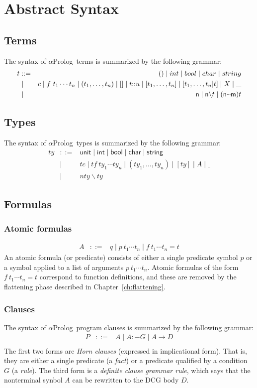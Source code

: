 \documentclass[draft,12pt]{report}
\newcommand{\aprolog}{$\alpha${Prolog}\xspace}
\newcommand{\ent}{\mathrel{{:}{-}}}
\begin{document}
\section{Abstract Syntax}
\subsection{Terms}

The syntax of \aprolog\ terms is summarized by the following grammar:
\begin{eqnarray*}
t &::=& () \mid int  \mid bool \mid char \mid string \\
&\mid&  c \mid f~t_1 \cdots t_n \mid (t_1,\ldots,t_n) \mid  [] \mid t{::}u \mid [t_1, \ldots , t_n] \mid [t_1, \ldots,t_n|t] \mid X \mid \_ \\
&\mid& \mathsf{n} \mid \mathsf{n} \backslash t \mid (\mathsf{n}\text{\symbol{126}}\mathsf{m})t
\end{eqnarray*}
\subsection{Types}
The syntax of \aprolog\ types is summarized by the following grammar:
\begin{eqnarray*}
ty &::=& \mathsf{unit} \mid \mathsf{int}  \mid \mathsf{bool} \mid \mathsf{char} \mid \mathsf{string} \\
&\mid&  tc \mid tf~ty_1 \cdots ty_n \mid (ty_1,\ldots,ty_n) \mid  [ty]\mid A \mid \_ \\
&\mid& nty \backslash ty
\end{eqnarray*}
\subsection{Formulas}
\subsubsection{Atomic formulas}
\begin{eqnarray*}
A & ::= & q \mid p~t_1\cdots t_n  \mid f~t_1\cdots t_n = t
\end{eqnarray*}
An atomic formula (or predicate) consists of either a single predicate
symbol $p$ or a symbol applied to a list of arguments $p~t_1\cdots
t_n$. Atomic formulas of the form $f~t_1\cdots t_n= t$ correspond to
function definitions, and these are removed by the flattening phase
described in Chapter~\ref{ch:flattening}.

\subsubsection{Clauses}
The syntax of \aprolog\ program clauses is summarized by the following
grammar:
\begin{eqnarray*}
P &::=&  A \mid A \ent G \mid A \longrightarrow D\\
\end{eqnarray*}
The first two forms are \emph{Horn clauses} (expressed in
implicational form).  That is, they are either a single predicate (a
\emph{fact}) or a predicate qualified by a condition $G$ (a
\emph{rule}).  The third form is a \emph{definite clause grammar
  rule}, which says that the nonterminal synbol $A$ can be rewritten
to the DCG body $D$.
\end{document}
